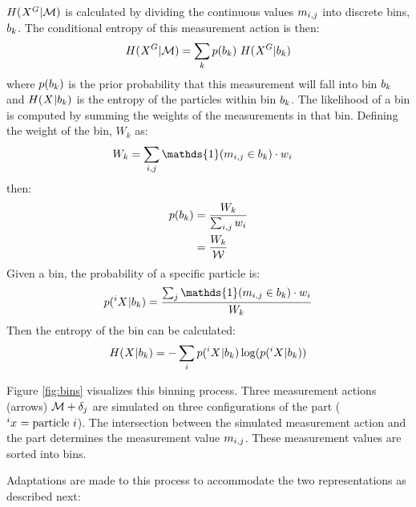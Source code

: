 \documentclass[../thesis.tex]{subfiles}
\begin{document}
$H(\particles[][][G]|\maction)$ is calculated by dividing the continuous values $m_{i,j}$ into discrete bins, $b_k$.
The conditional entropy of this measurement action is then:
\begin{align}
    H(\particles[][][G]|\maction) = \sum_k p(\bin_k) \  H(\particles[][][G] | \bin_k)
\end{align}
where $p(b_k)$ is the prior probability that this measurement will fall into bin $b_k$ and
$H(\particles | \bin_k)$ is the entropy of the particles within bin $b_k$. 
The likelihood of a bin is computed by summing the weights of the measurements in that bin. Defining the weight of the bin, $W_k$ as:
\begin{align}
  W_k &= \sum_{i,j} \mathds{1}(\measurement_{i,j} \in \bin_k) \cdot w_i
\end{align}
then:
\begin{align}
  p(b_k) &= \frac{W_k}{\sum_{i,j}w_i}\\
  &= \frac{W_k}{\mathcal{W}}
\end{align}
Given a bin, the probability of a specific particle is:
\begin{align}
  p(\particles[][i]| \bin_k) = \frac{\sum_{j} \mathds{1}(\measurement_{i,j} \in \bin_k) \cdot w_i}{W_k}
\end{align}
Then the entropy of the bin can be calculated:
\begin{align}
  H(\particles | \bin_k) = -\sum_i p(\particles[][i]|\bin_k) \log(p(\particles[][i]|\bin_k))
\end{align}

Figure \ref{fig:bins} visualizes this binning process. Three measurement actions (arrows) $\mathcal{M} + \delta_j$ are simulated on three configurations of the part ($\particle[][i] = \text{particle } i$). The intersection between the simulated measurement action and the part determines the measurement value $m_{i,j}$. These measurement values are sorted into bins.

Adaptations are made to this process to accommodate the two representations as described next:
\end{document}
